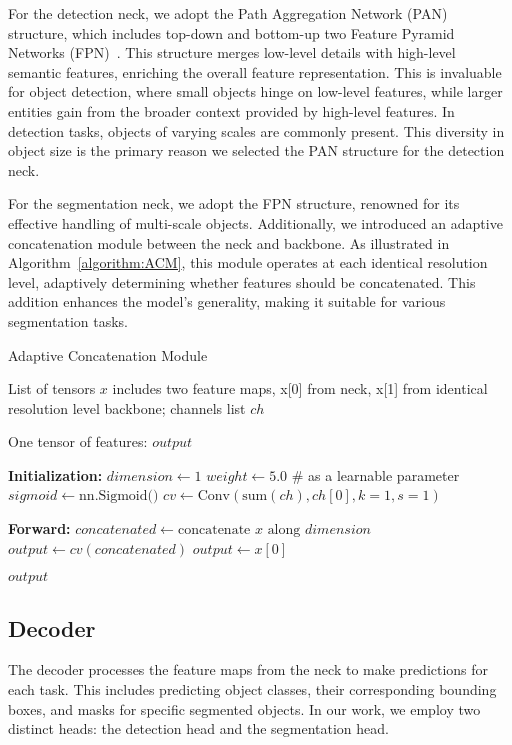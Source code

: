 \documentclass[lettersize,journal]{IEEEtran}
\newcommand{\INPUT}{\item[\textbf{Input:}]}
\newcommand{\OUTPUT}{\item[\textbf{Output:}]}
\begin{document}
For the detection neck, we adopt the Path Aggregation Network (PAN)~\cite{liu2018path} structure, which includes top-down and bottom-up two Feature Pyramid Networks (FPN)~\cite{lin2017feature}. This structure merges low-level details with high-level semantic features, enriching the overall feature representation. This is invaluable for object detection, where small objects hinge on low-level features, while larger entities gain from the broader context provided by high-level features. In detection tasks, objects of varying scales are commonly present. This diversity in object size is the primary reason we selected the PAN structure for the detection neck.

For the segmentation neck, we adopt the FPN structure, renowned for its effective handling of multi-scale objects. Additionally, we introduced an adaptive concatenation module between the neck and backbone. As illustrated in Algorithm~\ref{algorithm:ACM}, this module operates at each identical resolution level, adaptively determining whether features should be concatenated. This addition enhances the model's generality, making it suitable for various segmentation tasks.


\begin{algorithm}[h]
\caption{Adaptive Concatenation Module}
\begin{algorithmic}[1]
\label{algorithm:ACM}
\INPUT List of tensors \( x \) includes two feature maps, x[0] from neck, x[1] from  identical resolution level backbone; channels list \( ch \)
\OUTPUT One tensor of features: \( output \)

\STATE \textbf{Initialization:}
\STATE \( dimension \leftarrow 1 \)
\STATE \( weight \leftarrow 5.0 \) \# as a learnable parameter
\STATE \( sigmoid \leftarrow \text{nn.Sigmoid()} \)
\STATE \( cv \leftarrow \text{Conv}(\text{sum}(ch), ch[0], k=1, s=1) \) 

\STATE \textbf{Forward:}
    \STATE \( concatenated \leftarrow \text{concatenate } x \text{ along } dimension \)
    \STATE \( output \leftarrow cv(concatenated) \)
\ELSE
    \STATE \( output \leftarrow x[0] \)
\ENDIF

\RETURN \( output \)

\end{algorithmic}
\end{algorithm}



\subsection{Decoder}
\label{subsec: Decoder}
The decoder processes the feature maps from the neck to make predictions for each task. This includes predicting object classes, their corresponding bounding boxes, and masks for specific segmented objects. In our work, we employ two distinct heads: the detection head and the segmentation head. 
\end{document}
